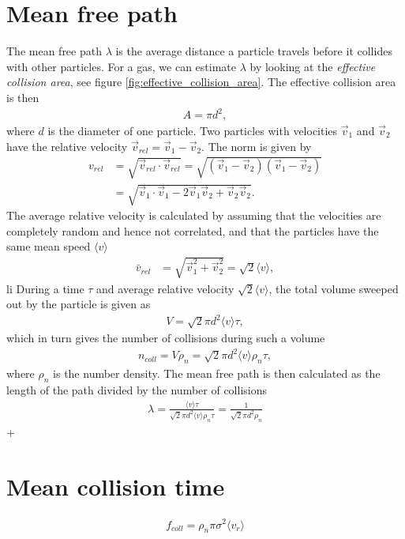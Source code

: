 \section{Mean free path}
\label{sec:mean_free_path_calculation}
The mean free path $\lambda$ is the average distance a particle travels before it collides with other particles. For a gas, we can estimate $\lambda$ by looking at the \textit{effective collision area}, see figure \ref{fig:effective_collision_area}. The effective collision area is then
\begin{align}
	A = \pi d^2,
\end{align}
where $d$ is the diameter of one particle. Two particles with velocities $\vec v_1$ and $\vec v_2$ have the relative velocity $\vec v_{rel} = \vec v_1 - \vec v_2$. The norm is given by
\begin{align}
	v_{rel} &= \sqrt{\vec v_{rel}\cdot \vec v_{rel} } = \sqrt{ (\vec v_1 - \vec v_2)(\vec v_1 - \vec v_2)}\\
	&= \sqrt{\vec v_1\cdot \vec v_1 - 2\vec v_1\vec v_2 + \vec v_2\vec v_2}.
\end{align}
The average relative velocity is calculated by assuming that the velocities are completely random and hence not correlated, and that the particles have the same mean speed $\langle v\rangle$
\begin{align}
	\bar v_{rel} &= \sqrt{\vec v_1^2 + \vec v_2^2} = \sqrt 2 \langle v\rangle,
\end{align}li
During a time $\tau$ and average relative velocity $\sqrt 2 \langle v\rangle$, the total volume sweeped out by the particle is given as
\begin{align}
	V = \sqrt 2 \pi d^2\langle v\rangle \tau,
\end{align}
which in turn gives the number of collisions during such a volume
\begin{align}
	\label{eq:num_collisions}
	n_{coll} = V\rho_n = \sqrt 2 \pi d^2\langle v\rangle \rho_n \tau,
\end{align}
where $\rho_n$ is the number density. The mean free path is then calculated as the length of the path divided by the number of collisions
\begin{align}
	\label{eq:mean_free_path}
	\lambda = \frac{\langle v\rangle \tau}{ \sqrt 2 \pi d^2\langle v\rangle \rho_n\tau} = \frac{1 }{ \sqrt 2 \pi d^2 \rho_n}
\end{align}+
\section{Mean collision time}
\begin{align}
	\label{eq:coll_frequency}
	f_{coll} = \rho_n \pi \sigma^2 \langle v_r \rangle
\end{align}